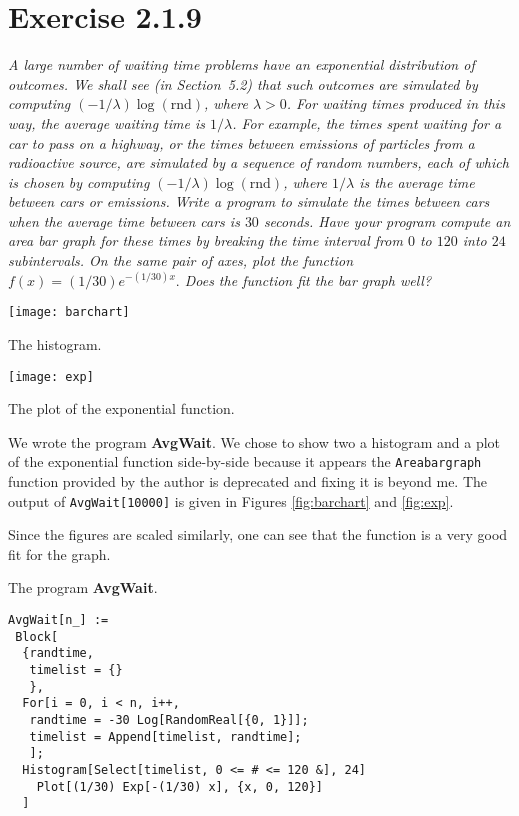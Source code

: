 \documentclass{tufte-handout}
\newenvironment{listingenv} {
  \begin{mylisting}
} {
  \end{mylisting}
}
\begin{document}
\section{Exercise 2.1.9}

\textit{A large number of waiting time problems have an exponential
  distribution of outcomes. We shall see (in Section~5.2) that such
  outcomes are simulated by computing
  $(-1/\lambda)\log{(\mathrm{rnd})}$, where $\lambda > 0$. For waiting
  times produced in this way, the average waiting time is
  $1/\lambda$. For example, the times spent waiting for a car to pass
  on a highway, or the times between emissions of particles from a
  radioactive source, are simulated by a sequence of random numbers,
  each of which is chosen by computing
  $(-1/\lambda)\log{(\mathrm{rnd})}$, where $1/\lambda$ is the average
  time between cars or emissions. Write a program to simulate the
  times between cars when the average time between cars is $30$
  seconds. Have your program compute an area bar graph for these times
  by breaking the time interval from $0$ to $120$ into $24$
  subintervals. On the same pair of axes, plot the function
  $f(x) = (1/30)e^{-(1/30)x}.$ Does the function fit the bar graph
  well?}

\bigskip

\begin{marginfigure}
  \centering
  \texttt{[image: barchart]}
  \caption{The histogram.}
  \label{fig:barchart}
\end{marginfigure}

\begin{marginfigure}[4cm]
  \texttt{[image: exp]}
  \caption{The plot of the exponential function.}
  \label{fig:exp}
\end{marginfigure}

We wrote the program \textbf{AvgWait}.  We chose to show two a
histogram and a plot of the exponential function side-by-side because
it appears the \lstinline$Areabargraph$ function provided by the
author is deprecated and fixing it is beyond me. The output of
\lstinline$AvgWait[10000]$ is given in Figures \ref{fig:barchart} and
\ref{fig:exp}.

Since the figures are scaled similarly, one can see that the function
is a very good fit for the graph.

\begin{listingenv}
\caption{The program \mbox{\textbf{AvgWait}}.}
\begin{lstlisting}
AvgWait[n_] :=
 Block[
  {randtime,
   timelist = {}
   },
  For[i = 0, i < n, i++,
   randtime = -30 Log[RandomReal[{0, 1}]];
   timelist = Append[timelist, randtime];
   ];
  Histogram[Select[timelist, 0 <= # <= 120 &], 24]
    Plot[(1/30) Exp[-(1/30) x], {x, 0, 120}]
  ]
\end{lstlisting}
\end{listingenv}
\end{document}
